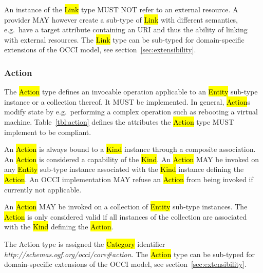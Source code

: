 \documentclass[10pt,a4paper,british]{article}
\begin{document}
An instance of the \hl{Link} type MUST NOT refer to an external resource.  A
provider MAY however create a sub-type of \hl{Link} with different semantics,
e.g.~have a target attribute containing an URI and thus the ability of linking
with external resources.
%
The \hl{Link} type can be sub-typed for domain-specific extensions of the
OCCI model, see section~\ref{sec:extensibility}.

\subsubsection{Action}
The \hl{Action} type defines an invocable operation applicable to an \hl{Entity}
sub-type instance or a collection thereof. It MUST be implemented. In general,
\hl{Action}s modify state by e.g.~performing a complex operation such as
rebooting a virtual machine.
%
Table~\ref{tbl:action} defines the attributes the \hl{Action} type MUST
implement to be compliant.


An \hl{Action} is always bound to a \hl{Kind} instance through a composite
association. An \hl{Action} is considered a capability of the \hl{Kind}.  An
\hl{Action} MAY be invoked on any \hl{Entity} sub-type instance associated with
the \hl{Kind} instance defining the \hl{Action}. An OCCI implementation MAY
refuse an \hl{Action} from being invoked if currently not applicable.

An \hl{Action} MAY be invoked on a collection of \hl{Entity} sub-type instances.
The \hl{Action} is only considered valid if all instances of the collection are
associated with the \hl{Kind} defining the \hl{Action}.

The Action type is assigned the \hl{Category} identifier
\textit{http://schemas.ogf.org/occi/core\#action}.
%
The \hl{Action} type can be sub-typed for domain-specific extensions of the
OCCI model, see section~\ref{sec:extensibility}.
\end{document}
